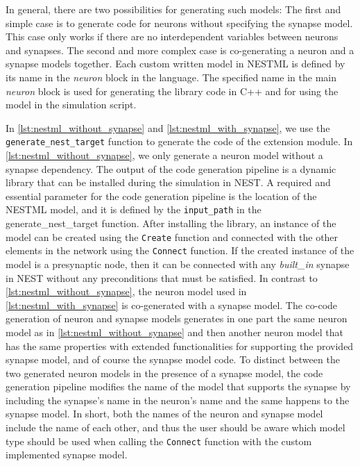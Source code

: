 In general, there are two possibilities for generating such models: The first and simple case is to generate code for neurons without specifying the synapse model. This case only works if there are no interdependent variables between neurons and synapses. The second and more complex case is co-generating a neuron and a synapse models together. Each custom written model in NESTML is defined by its name in the \emph{neuron} block in the language. The specified name in the main \emph{neuron} block is used for generating the library code in C++ and for using the model in the simulation script.


In \autoref{lst:nestml_without_synapse} and \autoref{lst:nestml_with_synapse}, we use the \texttt{generate\_nest\_target} function to generate the code of the extension module. In  \autoref{lst:nestml_without_synapse}, we only generate a neuron model without a synapse dependency. The output of the code generation pipeline is a dynamic library that can be installed during the simulation in NEST. A required and essential parameter for the code generation pipeline is the location of the NESTML model, and it is defined by the \texttt{input\_path} in the {generate\_nest\_target} function. After installing the library, an instance of the model can be created using the \texttt{Create} function and connected with the other elements in the network using the \texttt{Connect} function. If the created instance of the model is a presynaptic node, then it can be connected with any \emph{built\_in} synapse in NEST without any preconditions that must be satisfied. In contrast to \autoref{lst:nestml_without_synapse}, the neuron model used in \autoref{lst:nestml_with_synapse} is co-generated with a synapse model. The co-code generation of neuron and synapse models generates in one part the same neuron model as in  \autoref{lst:nestml_without_synapse} and then another neuron model that has the same properties with extended functionalities for supporting the provided synapse model, and of course the synapse model code. To distinct between the two generated neuron models in the presence of a synapse model, the code generation pipeline modifies the name of the model that supports the synapse by including the synapse's name in the neuron's name and the same happens to the synapse model. In short, both  the names of the neuron and synapse model include the name of each other, and thus the user should be aware which model type should be used when calling the \texttt{Connect} function with the custom implemented synapse model.

